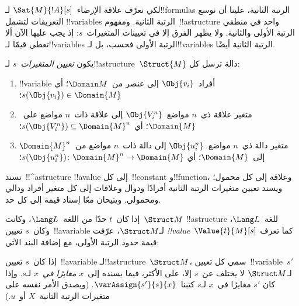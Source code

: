 \documentclass[../../../include/open-logic-section]{subfiles}
\begin{document}


\begin{explain}
لكي نعرّف علاقة الإرضاء~$\Sat{M}{!A}[s]$ لـ!!{formula}s الرتبة
الثانية، علينا أن نوسع التعريفات لتشمل !!{variable}s الرتبة الثانية.
ومفهوم~!!a{structure} واحد في منطقي الرتبة الأولى والثانية. ولا يظهر
الفرق إلا في تعيينات المتغيرات~$s$: إذ يجب عليها الآن ألا تعطي قيمًا
لـ!!{variable}s الرتبة الأولى فحسب، بل لـ!!{variable}s الرتبة الثانية
أيضًا.
\end{explain}

\begin{defn}
يكون \emph{تعيين المتغيرات}~$s$ لـ!!a{structure}~$\Struct{M}$ دالة
ترسل كل:
\begin{enumerate}
\item !!{variable} أفراد~$\Obj{v_i}$ إلى عنصر من~$\Domain M$؛ أي
  $s(\Obj{v_i}) \in \Domain{M}$؛
\item متغير علاقة ذي~$n$ مواضع~$\Obj{V_i^n}$ إلى علاقة ذات~$n$
  مواضع على~$\Domain{M}$؛ أي
  $s(\Obj{V_i^n}) \subseteq \Domain{M}^n$؛
\item متغير دالة ذي~$n$ مواضع~$\Obj{u_i^n}$ إلى دالة ذات~$n$ مواضع
  من~$\Domain{M}^n$ إلى~$\Domain{M}$؛ أي
  $s(\Obj{u_i^n})\colon \Domain{M}^n \to \Domain{M}$؛
\end{enumerate}
\end{defn}

\begin{explain}
تسند~!!^a{structure} !!a{value} إلى كل~!!{constant} و!!{function}،
وعلاقة إلى كل محمول؛ ويسند تعيين متغيرات الرتبة الثانية أفرادًا ودوال
وعلاقات إلى كل متغير أفراد ودالي ومحمولي. ويتيحان معًا إسناد قيمة إلى
كل حد.
\end{explain}

\begin{defn}
إذا كان~$t$ حدًا من اللغة~$\Lang L$، وكانت~$\Struct M$
!!a{structure} للغة~$\Lang L$، وكان~$s$ تعيين~!!a{variable}
لـ$\Struct M$، عرّفت \emph{!!{value}}~$\Value{t}{M}[s]$ كما تعرف
قيمة حدود الرتبة الأولى، مع إضافة البند الآتي:
\begin{quote}
\end{quote}
\end{defn}

\begin{defn}[المغاير في~$x$]
إذا كان~$s$ تعيين~!!a{variable} لـ!!a{structure}~$\Struct M$، سمي كل
تعيين~!!{variable}~$s'$ لـ$\Struct M$ لا يختلف عن~$s$ إلا، على
الأكثر، فيما يسنده إلى~$x$ \emph{مغايرًا في~$x$} لـ$s$. وإذا كان
$s'$ مغايرًا في~$x$ لـ$s$ كتبنا~$\varAssign{s'}{s}{x}$. (ويصدق
الأمر نفسه على متغيرات الرتبة الثانية~$X$ أو~$u$.)
\end{defn}
\end{document}
